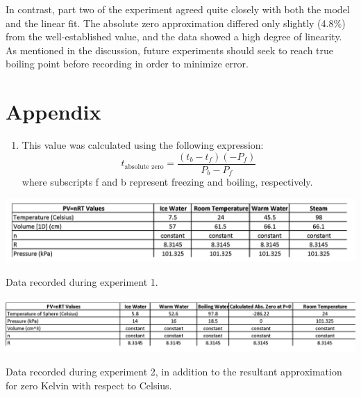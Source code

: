 \documentclass[%
 aip,
 jmp,%
 amsmath,amssymb,
 reprint,%
]{revtex4-1}
\begin{document}
  In contrast, part two of the experiment agreed quite closely with both the model and the linear fit. The absolute zero approximation differed only slightly (4.8$\%$) from the well-established value, and the data showed a high degree of linearity. As mentioned in the discussion, future experiments should seek to reach true boiling point before recording in order to minimize error.


  \section{Appendix}

  \begin{enumerate}
    \item This value was calculated using the following expression:
    $$t_{\text{absolute zero} } = \dfrac{(t_b - t_f)(-P_f)}{P_b-P_f}$$
    where subscripts f and b represent freezing and boiling, respectively.
  \end{enumerate}

  \begin{table}[h]
    \centering
    \includegraphics[scale=.4]{table1.png}
    \caption{Data recorded during experiment 1.}
    \label{t1}
  \end{table}

  \begin{table}[h]
    \centering
    \includegraphics[scale=.4]{table2.png}
    \caption{Data recorded during experiment 2, in addition to the resultant approximation for zero Kelvin with respect to Celsius.}
    \label{t2}
  \end{table}
\end{document}
